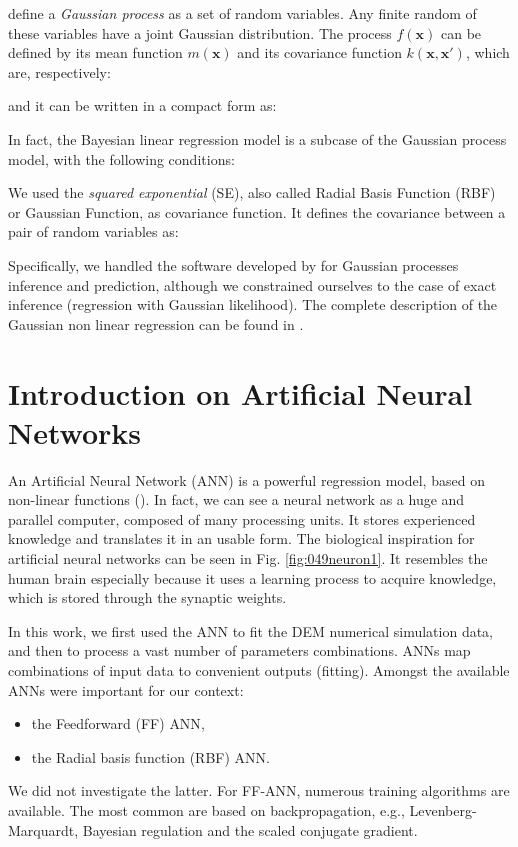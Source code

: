 \citet{RefWorks:192} define a \textit{Gaussian process} as a set of random variables. 
Any finite random of these variables have a joint Gaussian distribution.
The process $f(\mathbf{x})$ can be defined by its mean function $m(\mathbf{x})$
and its covariance function $k(\mathbf{x, x'})$, which are, respectively:


and it can be written in a compact form as:

In fact, the Bayesian linear regression model is a subcase of the Gaussian
process model, with the following conditions:

We used the \textit{squared exponential} (SE), also called Radial Basis Function
(RBF) or Gaussian Function, as covariance function. It defines the covariance
between a pair of random variables as:


Specifically, we handled the software developed by \citet{RefWorks:192} 
for Gaussian processes inference and prediction, although we constrained ourselves to the case of exact inference
(regression with Gaussian likelihood).
The complete description of the Gaussian non linear regression can be found in
\citet{RefWorks:194}.


\section{Introduction on Artificial Neural Networks}
\label{sec:annintro}
An Artificial Neural Network (\acs{ANN}) is a powerful regression model, 
based on non-linear functions (\citet{RefWorks:158}). 
In fact, we can see a neural network as a huge and parallel computer, composed
of many processing units. 
It stores experienced knowledge and translates it in
an usable form. 
The biological inspiration for artificial neural networks can be seen in Fig.
\ref{fig:049neuron1}. 
It resembles the human brain especially because it
uses a learning process to acquire knowledge, which is stored through the
synaptic weights.



In this work, we first used the \acs{ANN} to fit the \acs{DEM} numerical simulation
data, and then to process a vast number of parameters combinations. 
\acs{ANNs} map combinations of input data to convenient outputs (fitting). 
Amongst the available \acs{ANNs} were important for our context: 
\begin{itemize}
  \item {the Feedforward (\acs{FF}) \acs{ANN},}
  \item {the Radial basis function (\acs{RBF}) \acs{ANN}.}	
\end{itemize}
We did not investigate the latter.
For \acs{FF}-\acs{ANN},
numerous training algorithms are available. 
The most common are based on
backpropagation, e.g., Levenberg-Marquardt, Bayesian regulation and the scaled
conjugate gradient.

